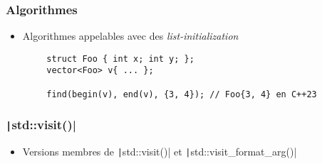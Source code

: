 \documentclass[C++.tex]{subfiles}
\begin{document}
\begin{frame}[fragile]
	\frametitle{Algorithmes}
	\begin{itemize}
		\item Algorithmes appelables avec des \textit{list-initialization}
	\end{itemize}

	\begin{verbatim}
		struct Foo { int x; int y; };
		vector<Foo> v{ ... };

		find(begin(v), end(v), {3, 4}); // Foo{3, 4} en C++23
	\end{verbatim}


\end{frame}


\begin{frame}[fragile]
	\frametitle{\texttt|std::visit()|}
	\begin{itemize}
		\item Versions membres de \texttt|std::visit()| et \texttt|std::visit_format_arg()|
	\end{itemize}

\end{frame}
\end{document}
